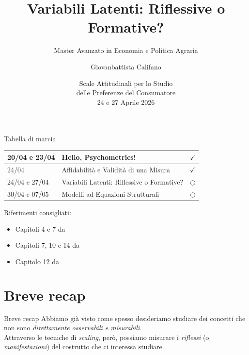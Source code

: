 \documentclass{beamer}
\title[Lezione 3]{Variabili Latenti: Riflessive o Formative?}
\subtitle{Master Avanzato in Economia e Politica Agraria}
\author{Giovanbattista Califano}
\date[Portici, 24/04/2026]{Scale Attitudinali per lo Studio \\ delle Preferenze del Consumatore \\24 e 27 Aprile 2026}
\institute[UNINA]{Università degli Studi di Napoli Federico II, giovanbattista.califano@unina.it}
\begin{document}
\frame{\titlepage}

\begin{frame}{Tabella di marcia}
    \begin{center}
        \begin{tabular}{|l|l|c|}
        \hline
        20/04 e 23/04 &  Hello, Psychometrics! & $\checkmark$ \\
        \hline
        24/04 & Affidabilità e Validità di una Misura & $\checkmark$ \\
        \hline
       24/04 e 27/04 & Variabili Latenti: Riflessive o Formative? & $\bigcirc$ \\
        \hline
        30/04 e 07/05 & Modelli ad Equazioni Strutturali & $\bigcirc$ \\
        \hline
        \end{tabular}
    \end{center}
\vspace{0.1cm}
\footnotesize
Riferimenti consigliati: \\
\begin{itemize}
    \item Capitoli 4 e 7 da \cite{jhangiani2019research}
    \item Capitoli 7, 10 e 14 da \cite{olivero2022psicologia}
    \item Capitolo 12 da \cite{mehmetoglu2022applied}
\end{itemize}
\scriptsize


\end{frame}

\section{Breve recap}
\begin{frame}{Breve recap}
    Abbiamo già visto come spesso desideriamo studiare dei concetti che non sono \textit{direttamente osservabili e misurabili}. \\
    \vspace{1em}
    Attraverso le tecniche di \textit{scaling}, però, possiamo misurare i \textit{riflessi} (o \textit{manifestazioni}) del costrutto che ci interessa studiare.
\end{frame}
\end{document}
